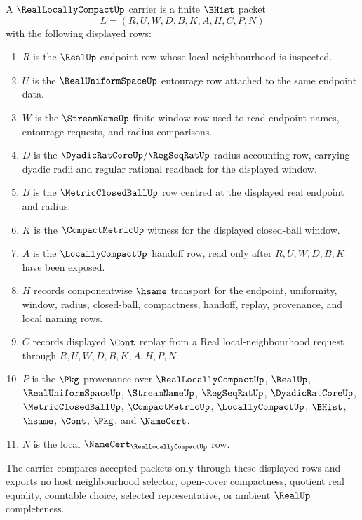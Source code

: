 \begin{definition}
\label{def:real-locally-compact-carrier}
A $\RealLocallyCompactUp$ carrier is a finite $\BHist$ packet
$$
L=(R,U,W,D,B,K,A,H,C,P,N)
$$
with the following displayed rows:
\begin{enumerate}
\item $R$ is the $\RealUp$ endpoint row whose local neighbourhood is inspected.
\item $U$ is the $\RealUniformSpaceUp$ entourage row attached to the same endpoint data.
\item $W$ is the $\StreamNameUp$ finite-window row used to read endpoint names, entourage requests, and radius comparisons.
\item $D$ is the $\DyadicRatCoreUp/\RegSeqRatUp$ radius-accounting row, carrying dyadic radii and regular rational readback for the displayed window.
\item $B$ is the $\MetricClosedBallUp$ row centred at the displayed real endpoint and radius.
\item $K$ is the $\CompactMetricUp$ witness for the displayed closed-ball window.
\item $A$ is the $\LocallyCompactUp$ handoff row, read only after $R,U,W,D,B,K$ have been exposed.
\item $H$ records componentwise $\hsame$ transport for the endpoint, uniformity, window, radius, closed-ball, compactness, handoff, replay, provenance, and local naming rows.
\item $C$ records displayed $\Cont$ replay from a Real local-neighbourhood request through $R,U,W,D,B,K,A,H,P,N$.
\item $P$ is the $\Pkg$ provenance over $\RealLocallyCompactUp$, $\RealUp$, $\RealUniformSpaceUp$, $\StreamNameUp$, $\RegSeqRatUp$, $\DyadicRatCoreUp$, $\MetricClosedBallUp$, $\CompactMetricUp$, $\LocallyCompactUp$, $\BHist$, $\hsame$, $\Cont$, $\Pkg$, and $\NameCert$.
\item $N$ is the local $\NameCert_{\RealLocallyCompactUp}$ row.
\end{enumerate}
The carrier compares accepted packets only through these displayed rows and exports no host neighbourhood selector, open-cover compactness, quotient real equality, countable choice, selected representative, or ambient $\RealUp$ completeness.
\end{definition}

